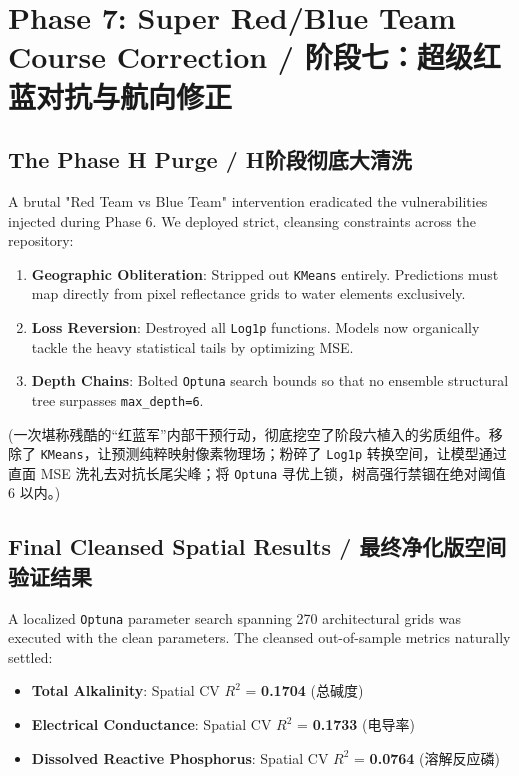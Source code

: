 \section{Phase 7: Super Red/Blue Team Course Correction / 阶段七：超级红蓝对抗与航向修正}

\subsection{The Phase H Purge / H阶段彻底大清洗}
A brutal "Red Team vs Blue Team" intervention eradicated the vulnerabilities injected during Phase 6. We deployed strict, cleansing constraints across the repository:
\begin{enumerate}
    \item \textbf{Geographic Obliteration}: Stripped out \texttt{KMeans} entirely. Predictions must map directly from pixel reflectance grids to water elements exclusively.
    \item \textbf{Loss Reversion}: Destroyed all \texttt{Log1p} functions. Models now organically tackle the heavy statistical tails by optimizing MSE.
    \item \textbf{Depth Chains}: Bolted \texttt{Optuna} search bounds so that no ensemble structural tree surpasses \texttt{max\_depth=6}.
\end{enumerate}
(一次堪称残酷的“红蓝军”内部干预行动，彻底挖空了阶段六植入的劣质组件。移除了 \texttt{KMeans}，让预测纯粹映射像素物理场；粉碎了 \texttt{Log1p} 转换空间，让模型通过直面 MSE 洗礼去对抗长尾尖峰；将 \texttt{Optuna} 寻优上锁，树高强行禁锢在绝对阈值 6 以内。)

\subsection{Final Cleansed Spatial Results / 最终净化版空间验证结果}
A localized \texttt{Optuna} parameter search spanning 270 architectural grids was executed with the clean parameters. The cleansed out-of-sample metrics naturally settled:
\begin{itemize}
    \item \textbf{Total Alkalinity}: Spatial CV $R^2$ = \textbf{0.1704} (总碱度)
    \item \textbf{Electrical Conductance}: Spatial CV $R^2$ = \textbf{0.1733} (电导率)
    \item \textbf{Dissolved Reactive Phosphorus}: Spatial CV $R^2$ = \textbf{0.0764} (溶解反应磷)
\end{itemize}

